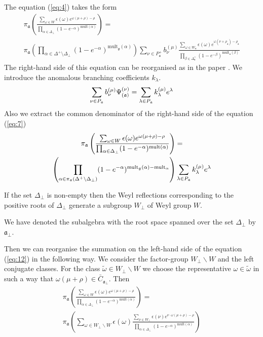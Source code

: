 \documentclass[a4paper,12pt]{article}
\theoremstyle{definition} \newtheorem{Def}{Definition}
\begin{document}
The equation (\ref{eq:4}) takes the form
\begin{multline}
  \label{eq:7}
  \pi_{\mathfrak{a}}\left(\frac{\sum_{\omega\in W} \epsilon(\omega) e^{\omega(\mu+\rho)-\rho}}{\prod_{\alpha\in\Delta_{\bot}}(1-e^{-\alpha})^{\mathrm{mult}(\alpha)}}\right) = \\
  \pi_{\mathfrak{a}}\left(\prod_{\alpha\in \Delta^{+}\setminus \Delta_{\bot}}(1-e^{-\alpha})^{\mathrm{mult}_{\mathfrak{g}}(\alpha)} \right)\sum_{\nu\in P^{+}_{\mathfrak{a}}}b^{(\mu)}_{\nu}
  \frac{\sum_{\omega\in W_{\mathfrak{a}}}\epsilon(\omega)e^{\omega(\nu+\rho_{\mathfrak{a}})-\rho_{\mathfrak{a}}}}{\prod_{\beta\in \Delta_{\mathfrak{a}}^{+}}(1-e^{-\beta})^{\mathrm{mult}_{\mathfrak{a}}(\beta)}}
\end{multline}
The right-hand side of this equation can be reorganised as in the paper \cite{ilyin812pbc}. We introduce the anomalous branching coefficients $k_{\lambda}$.
\begin{equation}
  \label{eq:10}
  \sum_{\nu \in P_{\frak{a}}}b_{\nu }^{\left( \mu \right) }\Psi _{\left( \frak{%
        a}\right) }^{\left( \nu \right) }=\sum_{\lambda \in P_{\frak{a}}}k_{\lambda
  }^{\left( \mu \right) }e^{\lambda } 
\end{equation}
Also we extract the common denominator of  the right-hand side of the equation (\ref{eq:7})
\begin{multline}
  \label{eq:12}
  \pi_{\mathfrak{a}}\left(\frac{\sum_{\omega\in W} \epsilon(\omega) e^{\omega(\mu+\rho)-\rho}}{\prod_{\alpha\in\Delta_{\bot}}(1-e^{-\alpha})^{\mathrm{mult}(\alpha)}}\right) = \\
  \left(\prod_{\alpha\in \pi_{\mathfrak{a}}\left(\Delta^{+}\setminus \Delta_{\bot}\right)}(1-e^{-\alpha})^{{\rm mult}_{\mathfrak{g}}(\alpha)-{\rm mult}_{\mathfrak{\alpha}}} \right)
    \sum_{\lambda \in P_{\frak{a}}}k_{\lambda}^{\left( \mu \right) }e^{\lambda } 
\end{multline}


If the set $\Delta_{\bot}$ is non-empty then the Weyl reflections corresponding to the positive roots of $\Delta_{\bot}$ generate a subgroup $W_{\bot}$ of Weyl group $W$. 

We have denoted the subalgebra with the root space spanned over the set $\Delta_{\bot}$ by $\mathfrak{a}_{\bot}$.

Then we can reorganise the summation on the left-hand side of the equation (\ref{eq:12}) in the following way.
We consider the factor-group $W_{\bot}\backslash W$ and the left conjugate classes. For the class $\tilde{\omega}\in W_{\bot}\backslash W$ we choose the representative $\omega \in \tilde{\omega}$ in such a way that $\omega(\mu+\rho)\in \bar{C}_{\mathfrak{a}_{\bot}}$. Then
\begin{multline}
  \label{eq:13}
 \pi_{\mathfrak{a}}\left(\frac{\sum_{\omega\in W} \epsilon(\omega) e^{\omega(\mu+\rho)-\rho}}{\prod_{\alpha\in\Delta_{\bot}}(1-e^{-\alpha})^{\mathrm{mult}(\alpha)}}\right) = \\
 \pi_{\mathfrak{a}}\left(\sum_{\omega\in W_{\bot}\backslash W} \epsilon(\omega) \frac{\sum_{\nu\in W_{\bot}}\epsilon(\nu) e^{\nu \cdot \omega(\mu+\rho)-\rho}}{\prod_{\alpha\in\Delta_{\bot}}(1-e^{-\alpha})^{\mathrm{mult}(\alpha)}}\right) 
\end{multline}
\end{document}
